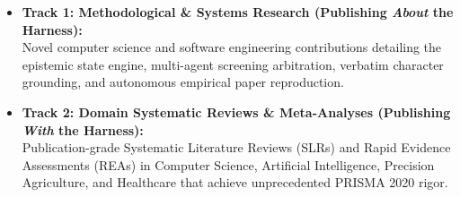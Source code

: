 \documentclass[10pt,a4paper]{article}
\begin{document}
\begin{itemize}[leftmargin=1.4em, itemsep=2pt, topsep=1pt]
    \item \textbf{Track 1: Methodological \& Systems Research (Publishing \textit{About} the Harness):}\\
    Novel computer science and software engineering contributions detailing the epistemic state engine, multi-agent screening arbitration, verbatim character grounding, and autonomous empirical paper reproduction.
    \item \textbf{Track 2: Domain Systematic Reviews \& Meta-Analyses (Publishing \textit{With} the Harness):}\\
    Publication-grade Systematic Literature Reviews (SLRs) and Rapid Evidence Assessments (REAs) in Computer Science, Artificial Intelligence, Precision Agriculture, and Healthcare that achieve unprecedented PRISMA 2020 rigor.
\end{itemize}
\end{document}
